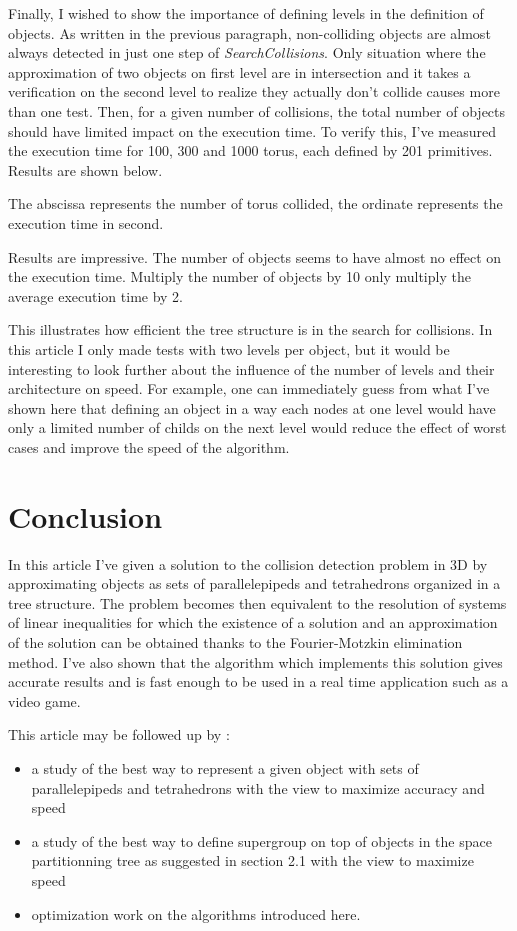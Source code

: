 \documentclass[12pt, a4paper]{article}
\begin{document}
Finally, I wished to show the importance of defining levels in the definition of objects. As written in the previous paragraph, non-colliding objects are almost always detected in just one step of {\em SearchCollisions}. Only situation where the approximation of two objects on first level are in intersection and it takes a verification on the second level to realize they actually don't collide causes more than one test. Then, for a given number of collisions, the total number of objects should have limited impact on the execution time. To verify this, I've measured the execution time for 100, 300 and 1000 torus, each defined by 201 primitives. Results are shown below.


The abscissa represents the number of torus collided, the ordinate represents the execution time in second. 

Results are impressive. The number of objects seems to have almost no effect on the execution time. Multiply the number of objects by 10 only multiply the average execution time by 2. 

This illustrates how efficient the tree structure is in the search for collisions. In this article I only made tests with two levels per object, but it would be interesting to look further about the influence of the number of levels and their architecture on speed. For example, one can immediately guess from what I've shown here that defining an object in a way each nodes at one level would have only a limited number of childs on the next level would reduce the effect of worst cases and improve the speed of the algorithm. 

\section{Conclusion}

In this article I've given a solution to the collision detection problem in 3D by approximating objects as sets of parallelepipeds and tetrahedrons organized in a tree structure. The problem becomes then equivalent to the resolution of systems of linear inequalities for which the existence of a solution and an approximation of the solution can be obtained thanks to the Fourier-Motzkin elimination method. I've also shown that the algorithm which implements this solution gives accurate results and is fast enough to be used in a real time application such as a video game.

This article may be followed up by :
\begin{itemize}
\item a study of the best way to represent a given object with sets of parallelepipeds and tetrahedrons with the view to maximize accuracy and speed
\item a study of the best way to define supergroup on top of objects in the space partitionning tree as suggested in section 2.1 with the view to maximize speed
\item optimization work on the algorithms introduced here.
\end{itemize}
\end{document}

